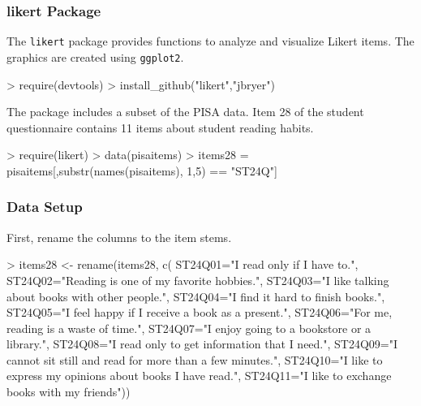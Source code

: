 \documentclass[10pt,slidestop,mathserif,c]{beamer}
\begin{document}
\begin{frame}
	\frametitle{likert Package}
	The \texttt{likert} package provides functions to analyze and visualize Likert items. The graphics are created using \texttt{ggplot2}.
	
\begin{Schunk}
\begin{Sinput}
> require(devtools)
> install_github("likert","jbryer")
\end{Sinput}
\end{Schunk}

    The package includes a subset of the PISA data. Item 28 of the student questionnaire contains 11 items about student reading habits.
    
\begin{Schunk}
\begin{Sinput}
> require(likert)
> data(pisaitems)
> items28 = pisaitems[,substr(names(pisaitems), 1,5) == "ST24Q"]
\end{Sinput}
\end{Schunk}

\end{frame}

\begin{frame}
	\frametitle{Data Setup}
    First, rename the columns to the item stems.
    
\begin{Schunk}
\begin{Sinput}
> items28 <- rename(items28, c(
   			ST24Q01="I read only if I have to.",
   			ST24Q02="Reading is one of my favorite hobbies.",
   			ST24Q03="I like talking about books with other people.",
   			ST24Q04="I find it hard to finish books.",
   			ST24Q05="I feel happy if I receive a book as a present.",
   			ST24Q06="For me, reading is a waste of time.",
   			ST24Q07="I enjoy going to a bookstore or a library.",
   			ST24Q08="I read only to get information that I need.",
   			ST24Q09="I cannot sit still and read for more than a few minutes.",
   			ST24Q10="I like to express my opinions about books I have read.",
   			ST24Q11="I like to exchange books with my friends"))
\end{Sinput}
\end{Schunk}
\end{frame}
\end{document}

